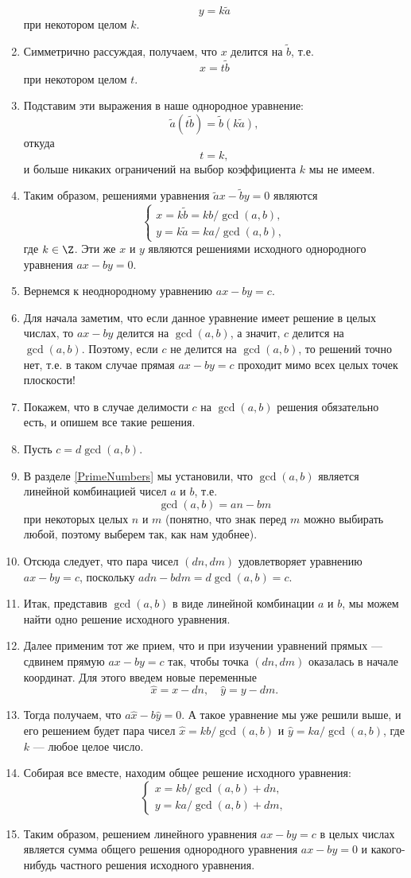 \begin{enumerate}
$$
y=k\tilde a
$$
при некотором целом $k$.
\item Симметрично рассуждая, получаем, что $x$ делится на $\tilde b$, т.е.
$$
x=t\tilde b
$$
при некотором целом $t$.
\item Подставим эти выражения в наше однородное уравнение:
$$
\tilde a(t\tilde b)=\tilde b(k\tilde a),
$$
откуда
$$
t=k,
$$
и больше никаких ограничений на выбор коэффициента $k$ мы не имеем.
\item Таким образом, решениями уравнения $\tilde ax-\tilde by=0$ являются
$$
\begin{cases}
x  =k\tilde b=kb/\gcd(a,b), \\
y  =k\tilde a=ka/\gcd(a,b),
\end{cases}
$$
где $k\in\Z$. Эти же $x$ и $y$ являются решениями исходного однородного уравнения $ax-by=0$.
\item Вернемся к неоднородному уравнению $ax-by=c$.
\item Для начала заметим, что если данное уравнение имеет решение в целых числах, то $ax-by$ делится на $\gcd(a,b)$, а значит, $c$ делится на $\gcd(a,b)$. Поэтому, если $c$ не делится на $\gcd(a,b)$, то решений точно нет, т.е. в таком случае прямая $ax-by=c$ проходит мимо всех целых точек плоскости!
\item Покажем, что в случае делимости $c$ на $\gcd(a,b)$ решения обязательно есть, и опишем все такие решения.
\item Пусть $c=d\gcd(a,b)$.
\item В разделе \ref{PrimeNumbers} мы установили, что $\gcd(a,b)$ является линейной комбинацией чисел $a$ и $b$, т.е.
$$
\gcd(a,b) = an-bm
$$
при некоторых целых $n$ и $m$ (понятно, что знак перед $m$ можно выбирать любой, поэтому выберем так, как нам удобнее).
\item Отсюда следует, что пара чисел $(dn,dm)$ удовлетворяет уравнению $ax-by=c$, поскольку
$adn-bdm=d\gcd(a,b)=c$.
\item Итак, представив $\gcd(a,b)$ в виде линейной комбинации $a$ и $b$, мы можем найти одно решение исходного уравнения.
\item Далее применим тот же прием, что и при изучении уравнений прямых --- сдвинем прямую $ax-by=c$ так, чтобы точка $(dn,dm)$ оказалась в начале координат. Для этого введем новые переменные
$$
\hat x = x-dn,\quad \hat y = y-dm.
$$
\item Тогда получаем, что $a\hat x-b\hat y = 0$. А такое уравнение мы уже решили выше, и его решением будет пара чисел $\hat x = kb/\gcd(a,b)$ и $\hat y = ka/\gcd(a,b)$, где $k$ --- любое целое число.
\item Собирая все вместе, находим общее решение исходного уравнения:
$$
\begin{cases}
x  =kb/\gcd(a,b) + dn, \\
y  =ka/\gcd(a,b) + dm,
\end{cases}
$$
\item Таким образом, решением линейного уравнения $ax-by=c$ в целых числах является сумма общего решения однородного уравнения $ax-by=0$ и какого-нибудь частного решения исходного уравнения.


\end{enumerate}
